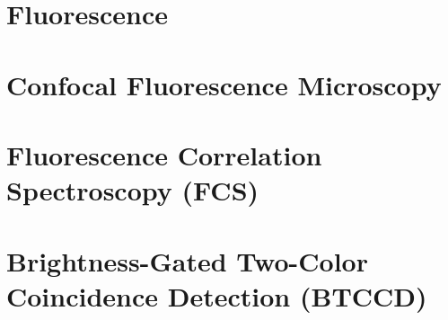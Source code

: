 \section{Fluorescence} \label{Section:Fluorescence}

\clearpage

\section{Confocal Fluorescence Microscopy}

\clearpage

\section{Fluorescence Correlation Spectroscopy (FCS)} \label{Section:FCS}

\clearpage

\section{Brightness-Gated Two-Color Coincidence Detection (BTCCD)} \label{Section:BTCCD}
